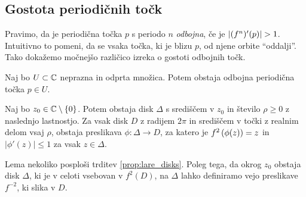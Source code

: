 \subsection{Gostota periodičnih točk}

Pravimo, da je periodična točka \(p\) s periodo \(n\) \emph{odbojna}, če je \(\left\lvert(f^n)' (p)\right\rvert > 1\). Intuitivno to pomeni, da se vsaka točka, ki je blizu \(p\), od njene orbite ``oddalji''. Tako dokažemo močnejšo različico izreka o gostoti odbojnih točk.

\begin{izrek} \label{thm:periodicdense}
    Naj bo \(U \subset \mathbb C\) neprazna in odprta množica. Potem obstaja odbojna periodična točka \(p \in U\).
\end{izrek}

\begin{lema} \label{lem:inversebranches}
    Naj bo \(z_0 \in \mathbb C \setminus \left\{ 0 \right\}\). Potem obstaja disk \(\Delta\) s središčem v \(z_0\) in število \(\rho \geq 0\) z naslednjo lastnostjo. Za vsak disk \(D\) z radijem \(2 \pi\) in središčem v točki z realnim delom vsaj \(\rho\), obstaja preslikava \(\phi \colon \Delta \to D\), za katero je \(f^2 \left( \phi (z) \right) = z\) in \(|\phi' (z)| \leq 1\) za vsak \(z \in \Delta\).
\end{lema}

\noindent Lema nekoliko posploši trditev \ref{prop:lare_disks}. Poleg tega, da okrog \(z_0\) obstaja disk \(\Delta\), ki je v celoti vsebovan v \(f^2 (D)\), na \(\Delta\) lahko definiramo vejo preslikave \(f^{-2}\), ki slika v \(D\).


